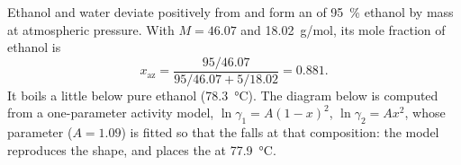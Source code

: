 \begin{example}\label{ex:b2:liquid-vapour-diagrams:ethanol-water}
Ethanol and water deviate positively from  and form an 
of 95~\% ethanol by mass at atmospheric pressure. With $M = 46.07$ and
\qty{18.02}{g/mol}, its mole fraction of ethanol is
\[
  x_{\text{az}} = \frac{95/46.07}{95/46.07 + 5/18.02} = 0.881 .
\]
It boils a little below pure ethanol (\qty{78.3}{\degreeCelsius}). The diagram
below is computed from a one-parameter activity model, $\ln\gamma_1 = A(1 -
x)^2$, $\ln\gamma_2 = Ax^2$, whose parameter ($A = 1.09$) is fitted so that the
 falls at that composition: the model reproduces the shape, and
places the  at \qty{77.9}{\degreeCelsius}.
\end{example}

